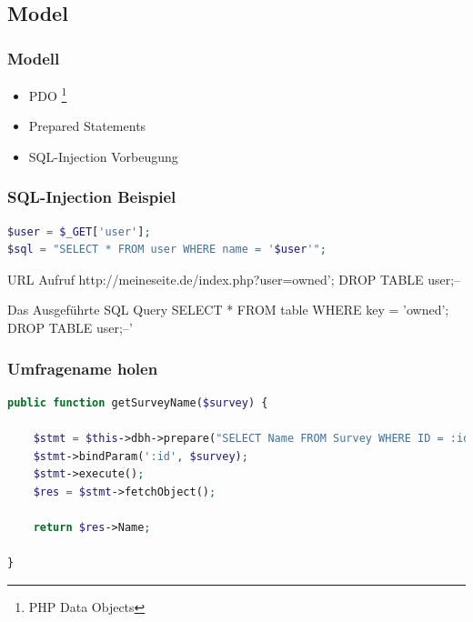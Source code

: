 \documentclass[xcolor=dvipsnames]{beamer}
\begin{document}
\subsection{Model}
\begin{frame} %
  \frametitle{Modell} %
  \begin{block}{}
	  \begin{itemize}
  		\item PDO \footnote{PHP Data Objects}
  		\item Prepared Statements
  		\item SQL-Injection Vorbeugung
	  \end{itemize}
  \end{block} 
\end{frame}

\begin{frame}[fragile] %
  \frametitle{SQL-Injection Beispiel} %

\begin{lstlisting}[language=PHP, caption=PHP Code der nicht Existieren sollte!!]
$user = $_GET['user'];
$sql = "SELECT * FROM user WHERE name = '$user'";
\end{lstlisting} 

\begin{block}{URL Aufruf}
http://meineseite.de/index.php?user=owned'; DROP TABLE user;--
\end{block}
 
  \begin{alertblock}{Das Ausgeführte SQL Query}
SELECT * FROM table WHERE key = 'owned'; DROP TABLE user;--'
	\end{alertblock} 


\end{frame}

\begin{frame}[fragile] %
  \frametitle{Umfragename holen} %

\begin{lstlisting}[language=PHP, caption=getSurveyName Funktion]
public function getSurveyName($survey) {
		
    $stmt = $this->dbh->prepare("SELECT Name FROM Survey WHERE ID = :id");
    $stmt->bindParam(':id', $survey);
    $stmt->execute();
    $res = $stmt->fetchObject();

    return $res->Name;
		
}
\end{lstlisting} 
\end{frame}
\end{document}
